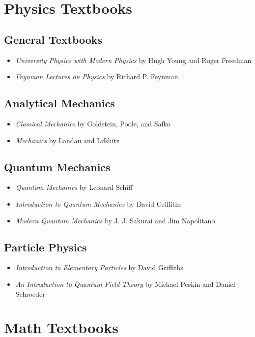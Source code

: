 \section{Physics Textbooks}
\subsection{General Textbooks}
\begin{itemize}
  \item \emph{University Physics with Modern Physics} by Hugh Young and Roger Freedman \cite{young-freedman}
  \item \emph{Feynman Lectures on Physics} by Richard P. Feynman \cite{feynman-lectures-online}
\end{itemize}

\subsection{Analytical Mechanics}
\begin{itemize}
  \item \emph{Classical Mechanics} by Goldstein, Poole, and Safko \cite{goldstein-classical}
  \item \emph{Mechanics} by Landau and Lifshitz \cite{landau-mechanics}
\end{itemize}

\subsection{Quantum Mechanics}
\begin{itemize}
  \item \emph{Quantum Mechanics} by Leonard Schiff \cite{schiff}
  \item \emph{Introduction to Quantum Mechanics} by David Griffiths \cite{griffiths-qm}
  \item \emph{Modern Quantum Mechanics} by J. J. Sakurai and Jim Napolitano \cite{jjsakurai-qm}
\end{itemize}


\subsection{Particle Physics}
\begin{itemize}
  \item \emph{Introduction to Elementary Particles} by David Griffiths \cite{griffith-introToEP}
  \item \emph{An Introduction to Quantum Field Theory} by Michael Peskin and Daniel Schroeder \cite{peskin-introToQFT}
\end{itemize}

\section{Math Textbooks}